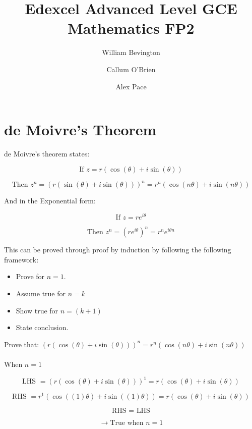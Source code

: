 \documentclass{article}
\title{Edexcel Advanced Level GCE Mathematics FP2}
\author{William Bevington \and Callum O'Brien \and Alex Pace}
\date{}
\begin{document}
\maketitle
\tableofcontents
\newpage

\section{de Moivre's Theorem}

de Moivre's theorem states:

\[\text{If } z=r\left(\cos\left(\theta\right)+i\sin\left(\theta\right)\right)\]

\[\text{Then } z^n=\left(r\left(\sin\left(\theta\right)+i\sin\left(\theta\right)\right)\right)^n=r^n\left(\cos\left(n\theta\right)+i\sin\left(n\theta\right)\right)\]

\noindent And in the Exponential form:

\[\text{If } z=re^{i\theta}\]

\[\text{Then } z^n=\left(re^{i\theta}\right)^n=r^ne^{i\theta n}\]

\noindent This can be proved through proof by induction by following the following framework:

\begin{itemize}
\item Prove for \(n=1\).
\item Assume true for \(n=k\)
\item Show true for \(n=\left(k+1\right)\)
\item State conclusion.
\end{itemize}

\noindent Prove that: \(\left(r\left(\cos\left(\theta\right)+i\sin\left(\theta\right)\right)\right)^n = r^n\left(\cos\left(n\theta\right)+i\sin\left(n\theta\right)\right)\) \\\\

\noindent When \(n=1\)

\[\text{LHS } = \left(r\left(\cos\left(\theta\right)+i\sin\left(\theta\right)\right)\right)^1=r\left(\cos\left(\theta\right)+i\sin\left(\theta\right)\right)\]

\[\text{RHS } = r^1\left(\cos\left(\left(1\right)\theta\right)+i\sin\left(\left(1\right)\theta\right)\right)=r\left(\cos\left(\theta\right)+i\sin\left(\theta\right)\right)\]

\[\text{RHS } = \text{ LHS}\]

\[\rightarrow \text{True when } n=1\]
\end{document}
